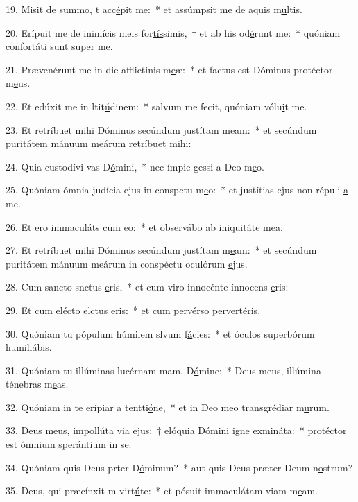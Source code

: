 19. Misit de summo, t acc\uline{é}pit me:~* et assúmpsit me de aquis m\uline{u}ltis.\par 
20. Erípuit me de inimícis meis for\uline{tís}simis,~† et ab his  od\uline{é}runt me:~* quóniam confortáti sunt s\uline{u}per me.\par 
21. Prævenérunt me in die afflictinis m\uline{e}æ:~* et factus est Dóminus protéctor m\uline{e}us.\par 
22. Et edúxit me in ltit\uline{ú}dinem:~* salvum me fecit, quóniam vólu\uline{i}t me.\par 
23. Et retríbuet mihi Dóminus secúndum justítam m\uline{e}am:~* et secúndum puritátem mánuum meárum retríbuet m\uline{i}hi:\par 
24. Quia custodívi vas D\uline{ó}mini,~* nec ímpie gessi a Deo m\uline{e}o.\par 
25. Quóniam ómnia judícia ejus in conspctu m\uline{e}o:~* et justítias ejus non répuli \uline{a} me.\par 
26. Et ero immaculáts cum \uline{e}o:~* et observábo ab iniquitáte m\uline{e}a.\par 
27. Et retríbuet mihi Dóminus secúndum justítam m\uline{e}am:~* et secúndum puritátem mánuum meárum in conspéctu oculórum \uline{e}jus.\par 
28. Cum sancto snctus \uline{e}ris,~* et cum viro innocénte ínnocens \uline{e}ris:\par 
29. Et cum elécto elctus \uline{e}ris:~* et cum pervérso pervert\uline{é}ris.\par 
30. Quóniam tu pópulum húmilem slvum f\uline{á}cies:~* et óculos superbórum humili\uline{á}bis.\par 
31. Quóniam tu illúminas lucérnam mam, D\uline{ó}mine:~* Deus meus, illúmina ténebras m\uline{e}as.\par 
32. Quóniam in te erípiar a tentti\uline{ó}ne,~* et in Deo meo transgrédiar m\uline{u}rum.\par 
33. Deus meus, impollúta via \uline{e}jus:~† elóquia Dómini igne exmin\uline{á}ta:~* protéctor est ómnium sperántium \uline{i}n se.\par 
34. Quóniam quis Deus prter D\uline{ó}minum?~* aut quis Deus præter Deum n\uline{o}strum?\par 
35. Deus, qui præcínxit m virt\uline{ú}te:~* et pósuit immaculátam viam m\uline{e}am.\par 
